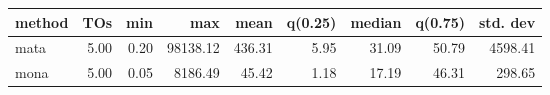 \begin{tabular}{lrrrrrrrr}
\hline
 method   &   TOs &   min &      max &   mean &   q(0.25) &   median &   q(0.75) &   std. dev \\
\hline
 mata     &  5.00 &  0.20 & 98138.12 & 436.31 &      5.95 &    31.09 &     50.79 &    4598.41 \\
 mona     &  5.00 &  0.05 &  8186.49 &  45.42 &      1.18 &    17.19 &     46.31 &     298.65 \\
\hline
\end{tabular}
